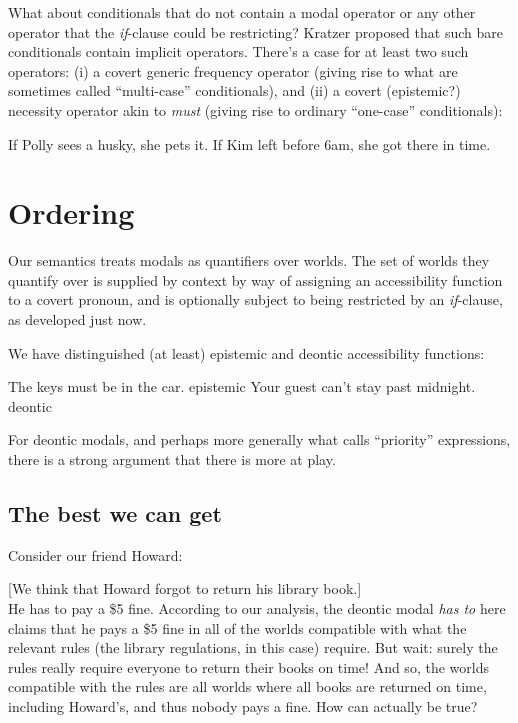 What about conditionals that do not contain a modal operator or any other
operator that the \emph{if}-clause could be restricting? Kratzer proposed that
such bare conditionals contain implicit operators. %
%
There's a case for at least two such operators: (i) a covert generic frequency
operator (giving rise to what are sometimes called ``multi-case'' conditionals),
and (ii) a covert (epistemic?) necessity operator akin to \emph{must} (giving
rise to ordinary ``one-case'' conditionals):

\pex
\a If Polly sees a husky, she pets it.
\a If Kim left before 6am, she got there in time.
\xe

\section{Ordering}
\label{sec:ordering}

\enlargethispage{36pt}%
Our semantics treats modals as quantifiers over worlds. The set of worlds they
quantify over is supplied by context by way of assigning an accessibility
function to a covert pronoun, and is optionally subject to being restricted by
an \emph{if}-clause, as developed just now.

We have distinguished (at least) epistemic and deontic accessibility functions:

\pex
\a The keys must be in the car.                                \hfill{epistemic}
\a Your guest can't stay past midnight.                          \hfill{deontic}
\xe

For deontic modals, and perhaps more generally what
\cite{portner-2017-mood-book} calls ``priority'' expressions, there is a strong
argument that there is more at play.

\subsection{The best we can get}
\label{subsec:best}

Consider our friend Howard:

\ex\label{ex:fine}[We think that Howard forgot to return his library book.]\\
He has to pay a \$5 fine.\xe
%
According to our analysis, the deontic modal \emph{has to} here claims that he
pays a \$5 fine in all of the worlds compatible with what the relevant rules
(the library regulations, in this case) require. But wait: surely the rules
really require everyone to return their books on time! And so, the worlds
compatible with the rules are all worlds where all books are returned on time,
including Howard’s, and thus nobody pays a fine. How can \Last actually be true?

